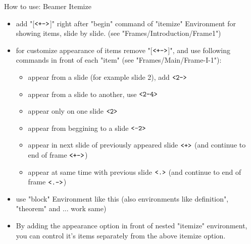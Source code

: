 \begin{frame}{How to use: Beamer Itemize}
     \begin{itemize}[<+->]
        \item add "[$\texttt{\detokenize{<+->}}$]" right after "begin" command of "itemize" Environment for showing items, slide by slide. (see "Frames/Introduction/Frame1")
        
        \item for customize appearance of items remove "[$\texttt{\detokenize{<+->}}$]", and use following commands in front of each "item" (see "Frames/Main/Frame-I-1"):
            \begin{itemize}[<.->]
                \item appear from a slide (for example slide 2), add $\texttt{\detokenize{<2->}}$
                \item appear from a slide to another, use $\texttt{\detokenize{<2-4>}}$
                \item appear only on one slide $\texttt{\detokenize{<2>}}$
                \item appear from beggining to a slide $\texttt{\detokenize{<-2>}}$
                \item appear in next slide of previously appeared slide $\texttt{\detokenize{<+>}}$ (and continue to end of frame $\texttt{\detokenize{<+->}}$)
                \item appear at same time with previous slide $\texttt{\detokenize{<.>}}$ (and continue to end of frame $\texttt{\detokenize{<.->}}$)
            \end{itemize}
        \item use "block" Environment like this (also environments like 
        definition", "theorem" and ... work same)
        
        \item By adding the appearance option in front of nested "itemize" environment, you can control it's items separately from the above itemize option.
     \end{itemize}
\end{frame}